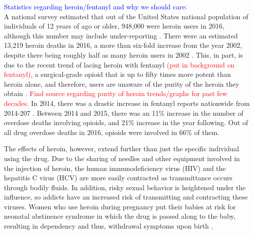 \documentclass[12pt]{article}
\begin{document}
\textcolor{blue}{Statistics regarding heroin/fentanyl and why we should care:} \\
A national survey estimated that out of the United States national population of individuals of 12 years of ago or older, 948,000 were heroin users in 2016, although this number may include under-reporting \cite{CDC2}. There were an estimated 13,219 heroin deaths in 2016, a more than six-fold increase from the year 2002, despite there being roughly half as many heroin users in 2002 \cite{NSDUH1}. This, in part, is due to the recent trend of lacing heroin with fentanyl \textcolor{red}{(put in background on fentanyl)}, a surgical-grade opioid that is up to fifty times more potent than heroin alone, and therefore, users are unaware of the purity of the heroin they obtain \cite{CDC1, NIH2, Volkow2}.  \textcolor{red}{Find source regarding purity of heroin trends/graphs for past few decades.} In 2014, there was a drastic increase in fentanyl reports nationwide from 2014-207 \cite{NFLIS1}. Between 2014 and 2015, there was an 11\% increase in the number of overdose deaths involving opioids, and 21\% increase in the year following. Out of all drug overdose deaths in 2016, opioids were involved in 66\% of them. 

The effects of heroin, however, extend further than just the specific individual using the drug. Due to the sharing of needles and other equipment involved in the injection of heroin, the human immunodeficiency virus (HIV) and the hepatitis C virus (HCV) are more easily contracted as transmittance occurs through bodily fluids. In addition, risky sexual behavior is heightened under the influence, so addicts have an increased risk of transmitting and contracting these viruses. Women who use heroin during pregnancy put their babies at risk for neonatal abstinence syndrome in which the drug is passed along to the baby, resulting in dependency and thus, withdrawal symptoms upon birth \cite{NIDA2}. 
\end{document}
